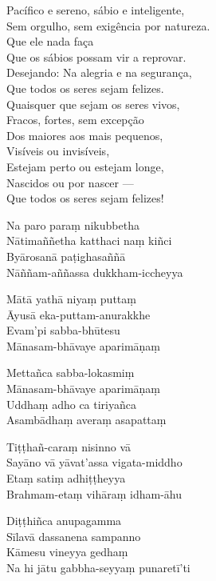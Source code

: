 Pacífico e sereno, sábio e inteligente,\\
Sem orgulho, sem exigência por natureza.\\
Que ele nada faça\\
Que os sábios possam vir a reprovar.\\
Desejando: Na alegria e na segurança,\\
Que todos os seres sejam felizes.\\
Quaisquer que sejam os seres vivos,\\
Fracos, fortes, sem excepção\\
Dos maiores aos mais pequenos,\\
Visíveis ou invisíveis,\\
Estejam perto ou estejam longe,\\
Nascidos ou por nascer ---\\
Que todos os seres sejam felizes!

\clearpage

Na paro paraṃ nikubbetha\\
Nātimaññetha katthaci naṃ kiñci\\
Byārosanā paṭighasaññā\\
Nāññam-aññassa dukkham-iccheyya

Mātā yathā niyaṃ puttaṃ\\
Āyusā eka-puttam-anurakkhe\\
Evam'pi sabba-bhūtesu\\
Mānasam-bhāvaye aparimāṇaṃ

Mettañca sabba-lokasmiṃ\\
Mānasam-bhāvaye aparimāṇaṃ\\
Uddhaṃ adho ca tiriyañca\\
Asambādhaṃ averaṃ asapattaṃ

Tiṭṭhañ-caraṃ nisinno vā\\
Sayāno vā yāvat'assa vigata-middho\\
Etaṃ satiṃ adhiṭṭheyya\\
Brahmam-etaṃ vihāraṃ idham-āhu

Diṭṭhiñca anupagamma\\
Sīlavā dassanena sampanno\\
Kāmesu vineyya gedhaṃ\\
Na hi jātu gabbha-seyyaṃ punaretī'ti

\clearpage

